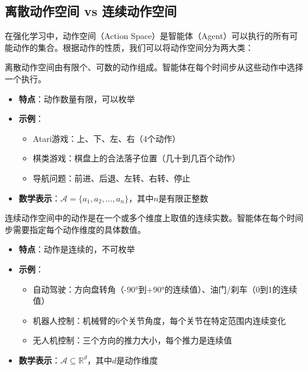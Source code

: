 

\subsection{离散动作空间 vs 连续动作空间}

在强化学习中，动作空间（Action Space）是智能体（Agent）可以执行的所有可能动作的集合。根据动作的性质，我们可以将动作空间分为两大类：

\begin{definition}
离散动作空间由有限个、可数的动作组成。智能体在每个时间步从这些动作中选择一个执行。
\begin{itemize}
    \item \textbf{特点}：动作数量有限，可以枚举
    \item \textbf{示例}：
    \begin{itemize}
        \item Atari游戏：上、下、左、右（4个动作）
        \item 棋类游戏：棋盘上的合法落子位置（几十到几百个动作）
        \item 导航问题：前进、后退、左转、右转、停止
    \end{itemize}
    \item \textbf{数学表示}：$\mathcal{A} = \{a_1, a_2, \dots, a_n\}$，其中$n$是有限正整数
\end{itemize}
\end{definition}

\begin{definition}
连续动作空间中的动作是在一个或多个维度上取值的连续实数。智能体在每个时间步需要指定每个动作维度的具体数值。
\begin{itemize}
    \item \textbf{特点}：动作是连续的，不可枚举
    \item \textbf{示例}：
    \begin{itemize}
        \item 自动驾驶：方向盘转角（-90°到+90°的连续值）、油门/刹车（0到1的连续值）
        \item 机器人控制：机械臂的6个关节角度，每个关节在特定范围内连续变化
        \item 无人机控制：三个方向的推力大小，每个推力是连续值
    \end{itemize}
    \item \textbf{数学表示}：$\mathcal{A} \subseteq \mathbb{R}^d$，其中$d$是动作维度
\end{itemize}
\end{definition}

